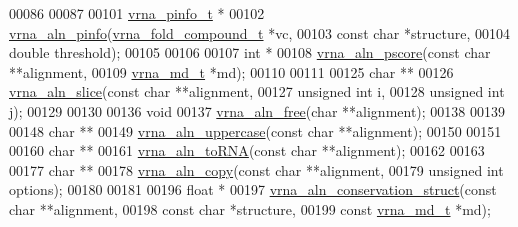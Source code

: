 \begin{DoxyCode}
00086 
00087 
00101 \mbox{\hyperlink{group__aln__utils_structvrna__pinfo__s}{vrna\_pinfo\_t}} *
00102 \mbox{\hyperlink{group__aln__utils_gaf6421a1318586c59fea6a127ed9f65f3}{vrna\_aln\_pinfo}}(\mbox{\hyperlink{group__fold__compound_structvrna__fc__s}{vrna\_fold\_compound\_t}} *vc,
00103                \textcolor{keyword}{const} \textcolor{keywordtype}{char}           *structure,
00104                \textcolor{keywordtype}{double}               threshold);
00105 
00106 
00107 \textcolor{keywordtype}{int} *
00108 \mbox{\hyperlink{group__aln__utils_ga36343f89b733b21697c981652248abca}{vrna\_aln\_pscore}}(\textcolor{keyword}{const} \textcolor{keywordtype}{char}  **alignment,
00109                 \mbox{\hyperlink{group__model__details_structvrna__md__s}{vrna\_md\_t}}   *md);
00110 
00111 
00125 \textcolor{keywordtype}{char} **
00126 \mbox{\hyperlink{group__aln__utils_gac801b0a72eac4ab9d5b2ef7533db9193}{vrna\_aln\_slice}}(\textcolor{keyword}{const} \textcolor{keywordtype}{char}   **alignment,
00127                \textcolor{keywordtype}{unsigned} \textcolor{keywordtype}{int} i,
00128                \textcolor{keywordtype}{unsigned} \textcolor{keywordtype}{int} j);
00129 
00130 
00136 \textcolor{keywordtype}{void}
00137 \mbox{\hyperlink{group__aln__utils_gac00dc80b8a324f151f92f11ab6850ecf}{vrna\_aln\_free}}(\textcolor{keywordtype}{char} **alignment);
00138 
00139 
00148 \textcolor{keywordtype}{char} **
00149 \mbox{\hyperlink{group__aln__utils_ga3a0476a71c4bae3d302790de58055704}{vrna\_aln\_uppercase}}(\textcolor{keyword}{const} \textcolor{keywordtype}{char} **alignment);
00150 
00151 
00160 \textcolor{keywordtype}{char} **
00161 \mbox{\hyperlink{group__aln__utils_ga7886fc678553c06472a712a335cde9cf}{vrna\_aln\_toRNA}}(\textcolor{keyword}{const} \textcolor{keywordtype}{char} **alignment);
00162 
00163 
00177 \textcolor{keywordtype}{char} **
00178 \mbox{\hyperlink{group__aln__utils_ga08cdca592461436860daf9738279ce17}{vrna\_aln\_copy}}(\textcolor{keyword}{const} \textcolor{keywordtype}{char}    **alignment,
00179               \textcolor{keywordtype}{unsigned} \textcolor{keywordtype}{int}  options);
00180 
00181 
00196 \textcolor{keywordtype}{float} *
00197 \mbox{\hyperlink{group__aln__utils_gab6f16a2ea93f3bfd4d089cc8d448bb16}{vrna\_aln\_conservation\_struct}}(\textcolor{keyword}{const} \textcolor{keywordtype}{char}       **alignment,
00198                              \textcolor{keyword}{const} \textcolor{keywordtype}{char}       *structure,
00199                              \textcolor{keyword}{const} \mbox{\hyperlink{group__model__details_structvrna__md__s}{vrna\_md\_t}}  *md);

\end{DoxyCode}
